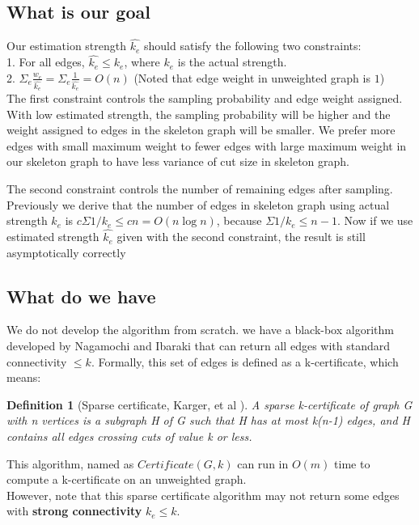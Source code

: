 \documentclass{article}
\newtheorem{definition}{Definition}
\begin{document}
\subsection{What is our goal}
Our estimation strength $\hat{k_e}$ should satisfy the following two constraints: \\
1. For all edges, $\hat{k_e} \leq k_e$, where $k_e$ is the actual strength. \\
2. $\Sigma_{e} \frac{w_e}{\hat{k_e}} = \Sigma_{e} \frac{1}{\hat{k_e}} = O(n)$ (Noted that edge weight in unweighted graph is $1$) \\

The first constraint controls the sampling probability and edge weight assigned. With low estimated strength, the sampling probability will be higher and the weight assigned to edges in the skeleton graph will be smaller. We prefer more edges with small maximum weight to fewer edges with large maximum weight in our skeleton graph to have less variance of cut size in skeleton graph. 

The second constraint controls the number of remaining edges after sampling. Previously we derive that the number of edges in skeleton graph using actual strength $k_e$ is $c\Sigma 1/k_e \leq cn = O(n \log n)$, because $\Sigma 1/k_e \leq n - 1$. 
Now if we use estimated strength $\hat{k_e}$ given with the second constraint, the result is still asymptotically correctly

\subsection{What do we have}
We do not develop the algorithm from scratch. we have a black-box algorithm developed by Nagamochi and Ibaraki \cite{nagamochi1992linear} that can return all edges with standard connectivity $\leq k$. 
Formally, this set of edges is defined as a k-certificate, which means:
\begin{definition} [Sparse certificate, Karger, et al \cite{benczur2015randomized}]
A sparse k-certificate of graph G with n vertices is a subgraph H of G such that H has at most k(n-1) edges, and H contains all edges crossing cuts of value k or less.
\end{definition}
This algorithm, named as \textbf{$Certificate(G, k)$} can run in $O(m)$ time to compute a k-certificate on an unweighted graph. \\

However, note that this sparse certificate algorithm may not return some edges with \textbf{strong connectivity} $k_e \leq k$. 
\end{document}
